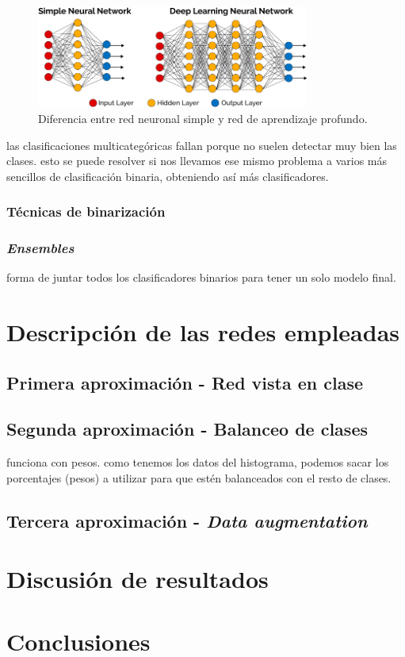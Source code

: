 \documentclass[]{scrartcl}
\begin{document}
		\begin{figure}[h]
			\centering
			\includegraphics[width=0.8\textwidth]{./img/neural-network-differences}
			\caption{Diferencia entre red neuronal simple y red de aprendizaje profundo.}
			\label{nn-differences}
		\end{figure}
	
		las clasificaciones multicategóricas fallan porque no suelen detectar muy bien las clases. esto se puede resolver si nos llevamos ese mismo problema a varios más sencillos de clasificación binaria, obteniendo así más clasificadores.
	
		\subsubsection{Técnicas de binarización}
		
		\subsubsection{\textit{Ensembles}}
		
			forma de juntar todos los clasificadores binarios para tener un solo modelo final.

\section{Descripción de las redes empleadas}

	\subsection{Primera aproximación - Red vista en clase}
	
	\subsection{Segunda aproximación - Balanceo de clases}
	
	funciona con pesos. como tenemos los datos del histograma, podemos sacar los porcentajes (pesos) a utilizar para que estén balanceados con el resto de clases.
	
	\subsection{Tercera aproximación - \textit{Data augmentation}}
	
\section{Discusión de resultados}

\section{Conclusiones}



\end{document}
